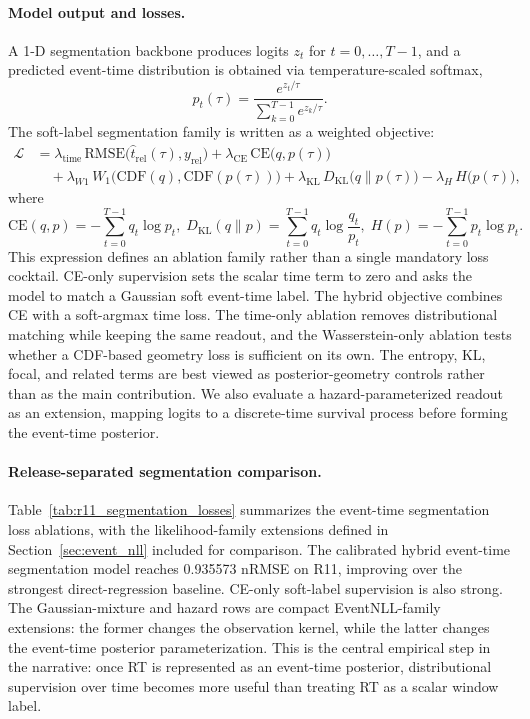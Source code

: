 \documentclass[12pt]{article}
\begin{document}
\paragraph{Model output and losses.}
A 1-D segmentation backbone produces logits $z_t$ for $t=0,\dots,T-1$, and a predicted
event-time distribution is obtained via temperature-scaled softmax,
\begin{equation}
\label{eq:rt_pred_dist}
p_t(\tau)=\frac{e^{z_t/\tau}}{\sum_{k=0}^{T-1} e^{z_k/\tau}}.
\end{equation}
The soft-label segmentation family is written as a weighted objective:
\begin{equation}
\label{eq:rt_loss}
\begin{aligned}
\mathcal{L}
&= \lambda_{\text{time}}\,\mathrm{RMSE}\big(\hat t_{\mathrm{rel}}(\tau), y_{\mathrm{rel}}\big)
 + \lambda_{\text{CE}}\,\mathrm{CE}\big(q, p(\tau)\big) \\
&\quad + \lambda_{W1}\,W_1\big(\mathrm{CDF}(q), \mathrm{CDF}(p(\tau))\big)
 + \lambda_{\text{KL}}\,D_{\mathrm{KL}}\big(q\|p(\tau)\big)
 - \lambda_{H}\,H\big(p(\tau)\big),
\end{aligned}
\end{equation}
where  
\begin{equation*}
\mathrm{CE}(q,p)=-\sum_{t=0}^{T-1} q_t \log p_t, \;
D_{\mathrm{KL}}(q\|p)=\sum_{t=0}^{T-1} q_t \log\frac{q_t}{p_t}, \;
H(p)=-\sum_{t=0}^{T-1} p_t \log p_t.
\end{equation*}
This expression defines an ablation family rather than a single mandatory loss cocktail. CE-only supervision sets the scalar time term to zero and asks the model to match a Gaussian soft event-time label. The hybrid objective combines CE with a soft-argmax time loss. The time-only ablation removes distributional matching while keeping the same readout, and the Wasserstein-only ablation tests whether a CDF-based geometry loss is sufficient on its own. The entropy, KL, focal, and related terms are best viewed as posterior-geometry controls rather than as the main contribution. We also evaluate a hazard-parameterized readout as an extension, mapping logits to a discrete-time survival process before forming the event-time posterior.

\paragraph{Release-separated segmentation comparison.}
Table~\ref{tab:r11_segmentation_losses} summarizes the event-time segmentation loss ablations, with the likelihood-family extensions defined in Section~\ref{sec:event_nll} included for comparison. The calibrated hybrid event-time segmentation model reaches 0.935573 nRMSE on R11, improving over the strongest direct-regression baseline. CE-only soft-label supervision is also strong. The Gaussian-mixture and hazard rows are compact EventNLL-family extensions: the former changes the observation kernel, while the latter changes the event-time posterior parameterization. This is the central empirical step in the narrative: once RT is represented as an event-time posterior, distributional supervision over time becomes more useful than treating RT as a scalar window label.
\end{document}
